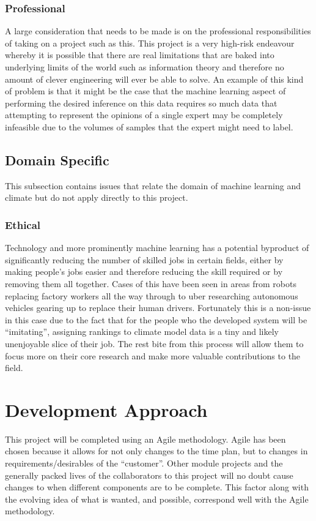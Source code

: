 \documentclass{ecmm427_assignment}
\begin{document}
\subsubsection{Professional}

 A large consideration that needs to be made is on the professional
responsibilities of taking on a project such as this. This project
is a very high-risk endeavour whereby it is possible that there
are real limitations that are baked into underlying limits of the world
such as information theory and therefore no amount of clever engineering
will ever be able to solve. An example of this kind of problem is
that it might be the case that the machine learning aspect of performing
the desired inference on this data requires so much data that attempting
to represent the opinions of a single expert may be completely infeasible
due to the volumes of samples that the expert might need to label. 

\subsection{Domain Specific}

This subsection contains issues that relate the domain of machine learning and climate but do not apply directly to this project.

\subsubsection{Ethical}

 Technology and more prominently machine learning has 
a potential byproduct of significantly reducing the number of skilled
jobs in certain fields, either by making people's jobs easier and
therefore reducing the skill required or by removing them all together.
Cases of this have been seen in areas from robots replacing factory
workers all the way through to uber researching autonomous vehicles
gearing up to replace their human drivers. Fortunately this is a non-issue
in this case due to the fact that for the people who the developed
system will be ``imitating'', assigning rankings to climate model
data is a tiny and likely unenjoyable slice of their job. The rest bite
from this process will allow them to focus more on their core research
and make more valuable contributions to the field. 



\section{Development Approach}
 This project will be completed using an Agile methodology. Agile has been chosen because it allows for not only changes to the time plan, but to changes in requirements/desirables of the “customer”. Other module projects and the generally packed lives of the collaborators to this project will no doubt cause changes to when different components are to be complete. This factor along with the evolving idea of what is wanted, and possible, correspond well with the Agile methodology.
\end{document}
